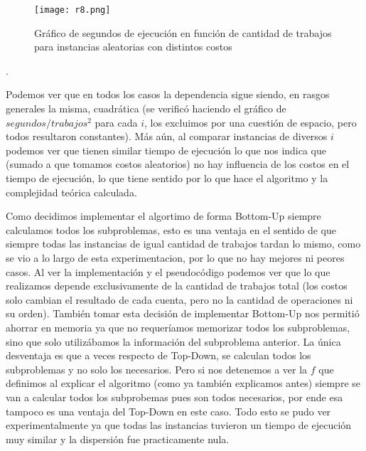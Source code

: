 \documentclass[A4paper,oneside,fleqn,11pt]{article}
\theoremstyle{definition}
\begin{document}
\vspace{8mm}

\begin{figure}[H]
	\captionsetup[subfigure]{position=b}
	\centering
	
		{\texttt{[image: r8.png]}}
	\caption{Gráfico de segundos de ejecución en función de cantidad de trabajos para instancias aleatorias con distintos costos}
\end{figure}
.

Podemos ver que en todos los casos la dependencia sigue siendo, en rasgos generales la misma, cuadrática (se verificó haciendo el gráfico de $segundos / trabajos^2$ para cada $i$, los excluimos por una cuestión de espacio, pero todos resultaron constantes). Más aún, al comparar instancias de diversos $i$ podemos ver que tienen similar tiempo de ejecución lo que nos indica que (sumado a que tomamos costos aleatorios) no hay influencia de los costos en el tiempo de ejecución, lo que tiene sentido por lo que hace el algoritmo y la complejidad teórica calculada.


Como decidimos implementar el algortimo de forma Bottom-Up siempre calculamos todos los subproblemas, esto es una ventaja en el sentido de que siempre todas las instancias de igual cantidad de trabajos tardan lo mismo, como se vio a lo largo de esta experimentacion, por lo que no hay mejores ni peores casos. Al ver la implementación y el pseudocódigo podemos ver que lo que realizamos depende exclusivamente de la cantidad de trabajos total (los costos solo cambian el resultado de cada cuenta, pero no la cantidad de operaciones ni su orden). También tomar esta decisión de implementar Bottom-Up nos permitió ahorrar en memoria ya que no requeríamos memorizar todos los subproblemas, sino que solo utilizábamos la información del subproblema anterior. La única desventaja es que a veces respecto de Top-Down, se calculan todos los subproblemas y no solo los necesarios. Pero si nos detenemos a ver la $f$ que definimos al explicar el algoritmo (como ya también explicamos antes) siempre se van a calcular todos los subprobemas pues son todos necesarios, por ende esa tampoco es una ventaja del Top-Down en este caso. Todo esto se pudo ver experimentalmente ya que todas las instancias tuvieron un tiempo de ejecución muy similar y la dispersión fue practicamente nula.
\end{document}
